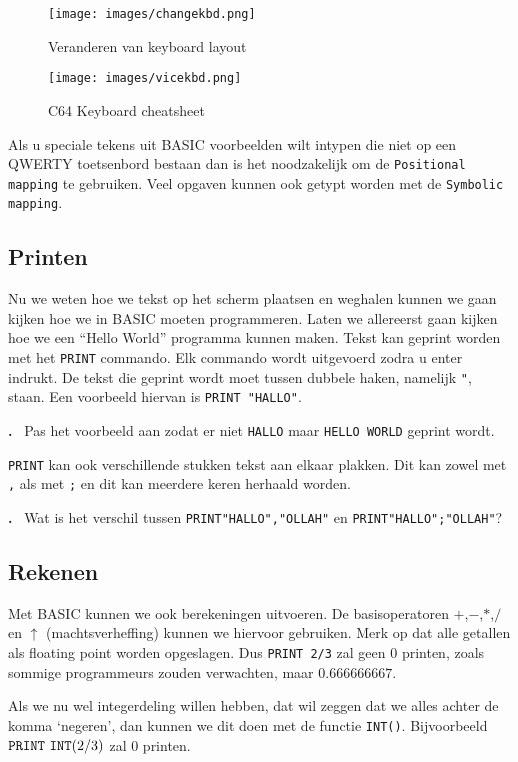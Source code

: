 \documentclass{article}
\newcounter{problem}
\newcounter{solution}
\newcommand\problem{%
  \stepcounter{problem}%
  \textbf{\theproblem.}~%
  \setcounter{solution}{0}%
}
\begin{document}
\begin{figure}
\centering
\texttt{[image: images/changekbd.png]}
\caption{Veranderen van keyboard layout}
\label{fig:changekbd}
\end{figure}

\begin{figure}
\centering
\texttt{[image: images/vicekbd.png]}
\caption{C64 Keyboard cheatsheet}
\label{fig:vicekbd}
\end{figure}

Als u speciale tekens uit BASIC voorbeelden wilt intypen die niet op een QWERTY toetsenbord bestaan dan is het noodzakelijk om de \verb:Positional mapping: te gebruiken.
Veel opgaven kunnen ook getypt worden met de \verb:Symbolic mapping:.

\subsection{Printen}

Nu we weten hoe we tekst op het scherm plaatsen en weghalen kunnen we gaan kijken hoe we in BASIC moeten programmeren.
Laten we allereerst gaan kijken hoe we een ``Hello World'' programma kunnen maken.
Tekst kan geprint worden met het \verb:PRINT: commando.
Elk commando wordt uitgevoerd zodra u enter indrukt.
De tekst die geprint wordt moet tussen dubbele haken, namelijk \verb:":, staan.
Een voorbeeld hiervan is \verb:PRINT "HALLO":.

\problem Pas het voorbeeld aan zodat er niet \verb:HALLO: maar \verb:HELLO WORLD: geprint wordt.

\verb:PRINT: kan ook verschillende stukken tekst aan elkaar plakken.
Dit kan zowel met \verb:,: als met \verb:;: en dit kan meerdere keren herhaald worden.

\problem Wat is het verschil tussen \verb:PRINT"HALLO","OLLAH": en \verb:PRINT"HALLO";"OLLAH":?

\subsection{Rekenen}

Met BASIC kunnen we ook berekeningen uitvoeren.
De basisoperatoren $+$,$-$,$*$,$/$ en $\uparrow$ (machtsverheffing) kunnen we hiervoor gebruiken.
Merk op dat alle getallen als floating point worden opgeslagen.
Dus \verb:PRINT 2/3: zal geen $0$ printen, zoals sommige programmeurs zouden verwachten, maar $0.666666667$.

Als we nu wel integerdeling willen hebben, dat wil zeggen dat we alles achter de komma `negeren',
dan kunnen we dit doen met de functie \verb:INT():.
Bijvoorbeeld $\verb:PRINT:\ \verb:INT:(2/3)$ zal $0$ printen.
\end{document}

